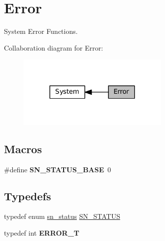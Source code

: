 \hypertarget{group__SYSTEM__ERROR}{}\section{Error}
\label{group__SYSTEM__ERROR}


System Error Functions.  


Collaboration diagram for Error\+:\nopagebreak
\begin{figure}[H]
\begin{center}
\leavevmode
\includegraphics[width=209pt]{group__SYSTEM__ERROR}
\end{center}
\end{figure}
\subsection*{Macros}
\begin{DoxyCompactItemize}
\item 
\mbox{\label{group__SYSTEM__ERROR_gae11b1d812e86d15ff7eef402ab14a522}} 
\#define {\bfseries S\+N\+\_\+\+S\+T\+A\+T\+U\+S\+\_\+\+B\+A\+SE}~0
\end{DoxyCompactItemize}
\subsection*{Typedefs}
\begin{DoxyCompactItemize}
\item 
typedef enum \hyperlink{group__SYSTEM__ERROR_ga8cb157fafd64d5b57cdc905615978e99}{sn\+\_\+status} \hyperlink{group__SYSTEM__ERROR_ga4540713b9a7a18ce44d78c3a10f7442f}{S\+N\+\_\+\+S\+T\+A\+T\+US}
\item 
\mbox{\label{group__SYSTEM__ERROR_ga8052e9054a9f729dd6df474e52738add}} 
typedef int {\bfseries E\+R\+R\+O\+R\+\_\+T}
\end{DoxyCompactItemize}
